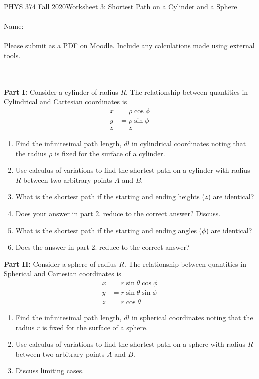 \documentclass[12pt]{article}
\begin{document}
PHYS 374 Fall 2020\hfill Worksheet 3: Shortest Path on a Cylinder and a Sphere\\
\\
Name: \\
\\
Please submit as a PDF on Moodle. Include any calculations made using external tools.

\hrulefill
\\
\\
\noindent
\textbf{Part I: }Consider a cylinder of radius $R$. The relationship between quantities in \href{https://mathworld.wolfram.com/CylindricalCoordinates.html}{Cylindrical} and Cartesian coordinates is
\begin{equation}
\begin{split}
x&=\rho\cos\phi\\
y&=\rho\sin\phi\\
z&=z
\end{split}
\end{equation}
\begin{enumerate}
\item Find the infinitesimal path length, $dl$ in cylindrical coordinates noting that the radius $\rho$ is fixed for the surface of a cylinder.
\item Use calculus of variations to find the shortest path on a cylinder with radius $R$ between two arbitrary points $A$ and $B$.
\item What is the shortest path if the starting and ending heights ($z$) are identical?
\item Does your answer in part 2. reduce to the correct answer? Discuss.
\item What is the shortest path if the starting and ending angles ($\phi$) are identical?
\item Does the answer in part 2. reduce to the correct answer?
\end{enumerate}
\textbf{Part II: }Consider a sphere of radius $R$. The relationship between quantities in \href{https://mathworld.wolfram.com/SphericalCoordinates.html}{Spherical} and Cartesian coordinates is
\begin{equation}
\begin{split}
x&=r\sin\theta\cos\phi\\
y&=r\sin\theta\sin\phi\\
z&=r\cos\theta
\end{split}
\end{equation}
\begin{enumerate}
\item Find the infinitesimal path length, $dl$ in spherical coordinates noting that the radius $r$ is fixed for the surface of a sphere.
\item Use calculus of variations to find the shortest path on a sphere with radius $R$ between two arbitrary points $A$ and $B$.
\item Discuss limiting cases.
\end{enumerate}
\end{document}
